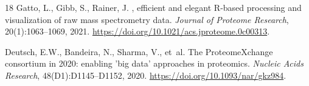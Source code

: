 \documentclass[11pt,twoside,openright]{book}
\begin{document}
\begin{thebibliography}{18}
Gatto, L., Gibb, S., Rainer, J.
, efficient and elegant {R}-based processing and visualization of raw mass spectrometry data.
\newblock \emph{Journal of Proteome Research}, 20(1):1063--1069, 2021.
\newblock \url{https://doi.org/10.1021/acs.jproteome.0c00313}.

Deutsch, E.W., Bandeira, N., Sharma, V., et~al.
\newblock The {ProteomeXchange} consortium in 2020: enabling 'big data' approaches in proteomics.
\newblock \emph{Nucleic Acids Research}, 48(D1):D1145--D1152, 2020.
\newblock \url{https://doi.org/10.1093/nar/gkz984}.

\end{thebibliography}
\end{document}
